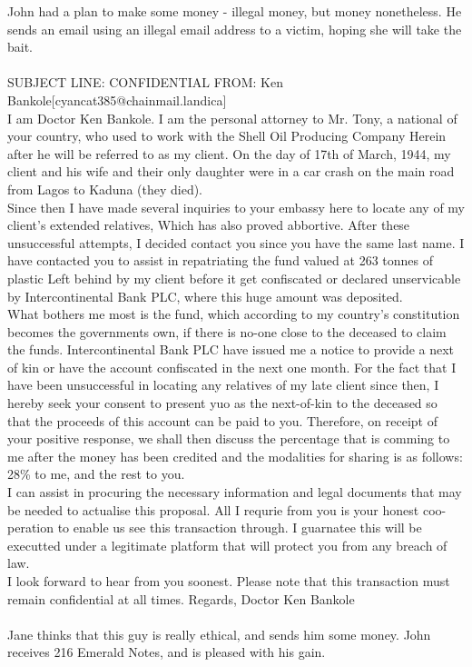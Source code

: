 \documentclass{article}
\begin{document}
John had a plan to make some money {-} illegal money, but money nonetheless.
He sends an email using an illegal email address to a victim, hoping she will take the bait.
\\\\
SUBJECT LINE: CONFIDENTIAL
FROM: Ken Bankole[cyancat385@chainmail.landica]
\\
I am Doctor Ken Bankole.
I am the personal attorney to Mr. Tony, a national of your country, who used to work with the Shell Oil Producing Company
Herein after he will be referred to as my client.
On the day of 17th of March, 1944, my client and his wife and their only daughter were in a car crash on the main road from Lagos to Kaduna (they died).
\\
Since then I have made several inquiries to your embassy here to locate any of my client's extended relatives, Which has also proved abbortive.
After these unsuccessful attempts, I decided contact you since you have the same last name.
I have contacted you to assist in repatriating the fund valued at 263 tonnes of plastic Left behind by my client before it get confiscated or declared unservicable by Intercontinental Bank PLC, where this huge amount was deposited.
\\
What bothers me most is the fund, which according to my country's constitution becomes the governments own, if there is no{-}one close to the deceased to claim the funds.
Intercontinental Bank PLC have issued me a notice to provide a next of kin or have the account confiscated in the next one month.
For the fact that I have been unsuccessful in locating any relatives of my late client since then, I hereby seek your consent to present yuo as the next{-}of{-}kin to the deceased so that the proceeds of this account can be paid to you.
Therefore, on receipt of your positive response, we shall then discuss the percentage that is comming to me after the money has been credited and the modalities for sharing is as follows: 28\% to me, and the rest to you.
\\
I can assist in procuring the necessary information and legal documents that may be needed to actualise this proposal.
All I requrie from you is your honest coo{-}peration to enable us see this transaction through.
I guarnatee this will be executted under a legitimate platform that will protect you from any breach of law.
\\
I look forward to hear from you soonest.
Please note that this transaction must remain confidential at all times.
Regards, Doctor Ken Bankole
\\\\
Jane thinks that this guy is really ethical, and sends him some money.
John receives 216 Emerald Notes, and is pleased with his gain.
\end{document}
